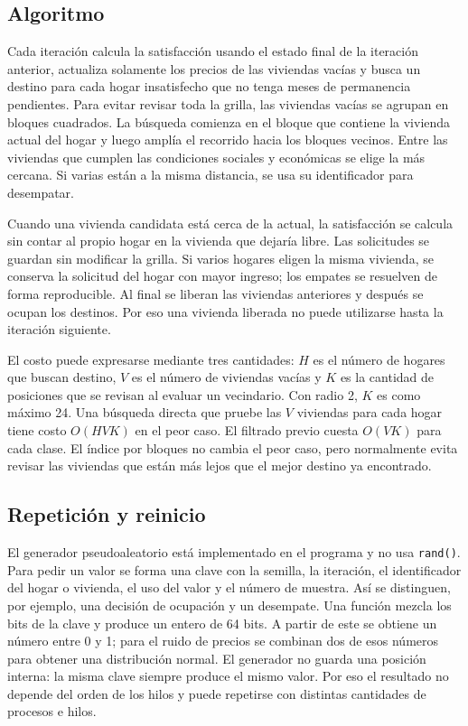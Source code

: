 \subsection{Algoritmo}

Cada iteración calcula la satisfacción usando el estado final de la iteración anterior, actualiza solamente los precios de las viviendas vacías y busca un destino para cada hogar insatisfecho que no tenga meses de permanencia pendientes. Para evitar revisar toda la grilla, las viviendas vacías se agrupan en bloques cuadrados. La búsqueda comienza en el bloque que contiene la vivienda actual del hogar y luego amplía el recorrido hacia los bloques vecinos. Entre las viviendas que cumplen las condiciones sociales y económicas se elige la más cercana. Si varias están a la misma distancia, se usa su identificador para desempatar.

Cuando una vivienda candidata está cerca de la actual, la satisfacción se calcula sin contar al propio hogar en la vivienda que dejaría libre. Las solicitudes se guardan sin modificar la grilla. Si varios hogares eligen la misma vivienda, se conserva la solicitud del hogar con mayor ingreso; los empates se resuelven de forma reproducible. Al final se liberan las viviendas anteriores y después se ocupan los destinos. Por eso una vivienda liberada no puede utilizarse hasta la iteración siguiente.

El costo puede expresarse mediante tres cantidades: $H$ es el número de hogares que buscan destino, $V$ es el número de viviendas vacías y $K$ es la cantidad de posiciones que se revisan al evaluar un vecindario. Con radio 2, $K$ es como máximo 24. Una búsqueda directa que pruebe las $V$ viviendas para cada hogar tiene costo $O(HVK)$ en el peor caso. El filtrado previo cuesta $O(VK)$ para cada clase. El índice por bloques no cambia el peor caso, pero normalmente evita revisar las viviendas que están más lejos que el mejor destino ya encontrado.

\subsection{Repetición y reinicio}

El generador pseudoaleatorio está implementado en el programa y no usa \texttt{rand()}. Para pedir un valor se forma una clave con la semilla, la iteración, el identificador del hogar o vivienda, el uso del valor y el número de muestra. Así se distinguen, por ejemplo, una decisión de ocupación y un desempate. Una función mezcla los bits de la clave y produce un entero de 64 bits. A partir de este se obtiene un número entre 0 y 1; para el ruido de precios se combinan dos de esos números para obtener una distribución normal. El generador no guarda una posición interna: la misma clave siempre produce el mismo valor. Por eso el resultado no depende del orden de los hilos y puede repetirse con distintas cantidades de procesos e hilos.

